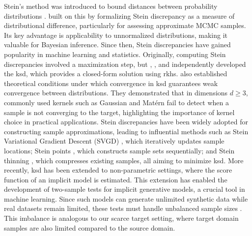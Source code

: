Stein's method was introduced to bound distances between probability distributions \citep{stein1972bound}. \citet{gorham_measuring_2015} built on this by formalizing Stein discrepancy as a measure of distributional difference, particularly for assessing approximate MCMC samples. Its key advantage is applicability to unnormalized distributions, making it valuable for Bayesian inference. Since then, Stein discrepancies have gained popularity in machine learning and statistics. 
Originally, computing Stein discrepancies involved a maximization step, 
but
\citet{liu_kernelized_2016}, \citet{chwialkowski_kernel_2016}, and \citet{gorham2017measuring} 
independently developed the \ac{ksd}, which provides a closed-form solution using \ac{rkhs}. \citet{gorham2017measuring} also established theoretical conditions under which convergence in \ac{ksd} guarantees weak convergence between distributions.
They demonstrated that in dimensions $d \geq 3$, commonly used kernels such as Gaussian and Matérn fail to detect when a sample is not converging to the target, highlighting the importance of kernel choice in practical applications. 
Stein discrepancies have been widely adopted for constructing sample approximations, leading to influential methods such as Stein Variational Gradient Descent (SVGD) \citep{liu_stein_2019}, which iteratively updates sample locations; Stein points \citep{chen2018stein}, which constructs sample sets sequentially; and Stein thinning \citep{riabiz2022optimal}, which compresses existing samples, all aiming to minimize \ac{ksd}. 
More recently, \ac{ksd} has been extended to non-parametric settings, where the score function of an implicit model is estimated. This extension has enabled the development of two-sample tests for implicit generative models, a crucial tool in machine learning. Since such models can generate unlimited synthetic data while real datasets remain limited, these tests must handle unbalanced sample sizes \citep{xu_kernelised_2022}. This imbalance is analogous to our scarce target setting, where target domain samples are also limited compared to the source domain.
